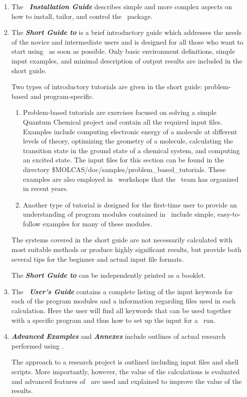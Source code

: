 \begin{enumerate}
\item The \textbf{\textit{\molcas\ Installation Guide}} describes simple and more complex aspects on how to install, tailor, and
control the \molcas\ package.

\item The \textbf{\textit{Short Guide to \molcas }} is a brief introductory guide which addresses the needs of the novice and intermediate users
and is designed for all those who want to start using \molcas\ as soon as possible. 
Only basic environment definitions, simple input examples, and minimal description of output results are included in the short guide.

Two types of introductory tutorials are given in the short guide: problem-based and program-specific.
\begin{enumerate}
\item Problem-based tutorials are exercises focused on solving a simple Quantum
Chemical project and contain all the required input files. Examples include 
computing electronic energy of a molecule at different levels of
theory, optimizing the geometry of a molecule, calculating the transition state in the ground
state of a chemical system, and computing an excited state.
The input files for this section can be found in the directory {\$MOLCAS/doc/samples/problem\_based\_tutorials}.
These examples are also employed in \molcas\ workshops that the \molcas\ team has organized in recent years.

\item Another type of tutorial is designed for the first-time user to provide an understanding of program modules 
contained in \molcas\ include simple, easy-to-follow examples for many of these modules.
\end{enumerate}

The systems covered in the short guide are not necessarily calculated with most suitable methods or produce highly significant results,
but provide both several tips for the beginner and actual input file formats.

The \textbf{\textit{Short Guide to \molcas}} can be independently printed as a booklet.
\item The \textbf{\textit{\molcas\ User's Guide}} contains a complete listing of the input
keywords for each of the program modules and a information regarding
files used in each calculation. Here the user will find all keywords that can be
used together with a specific program and thus how to set up the input for a
\molcas\ run.

\item \textit{\textbf{Advanced Examples}} and \textbf{\textit{Annexes}} include outlines of
actual research performed using \molcas. 

The approach to a research project is outlined including input files and shell scripts. More
importantly, however, the value of the calculations is evaluated and
advanced features of \molcasversion\ are used and explained to improve the
value of the results.
\end{enumerate}

